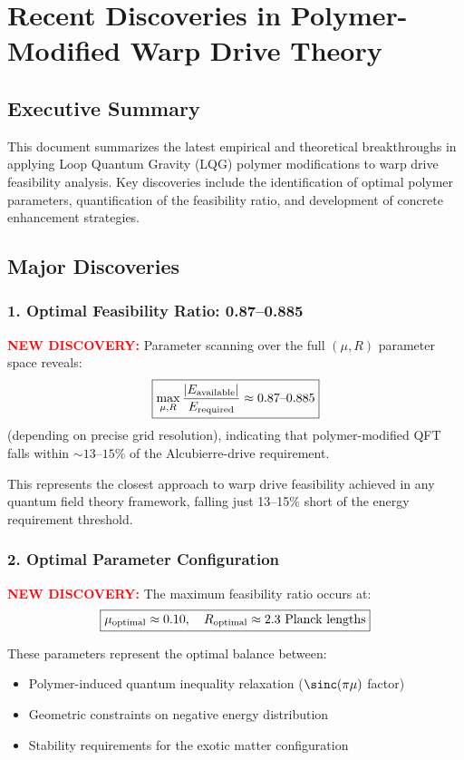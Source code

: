 \documentclass[11pt]{article}
\begin{document}
\section*{Recent Discoveries in Polymer-Modified Warp Drive Theory}

\subsection*{Executive Summary}
This document summarizes the latest empirical and theoretical breakthroughs in applying Loop Quantum Gravity (LQG) polymer modifications to warp drive feasibility analysis. Key discoveries include the identification of optimal polymer parameters, quantification of the feasibility ratio, and development of concrete enhancement strategies.

\subsection*{Major Discoveries}

\subsubsection*{1. Optimal Feasibility Ratio: 0.87--0.885}
\textcolor{red}{\textbf{NEW DISCOVERY:}} Parameter scanning over the full $(\mu, R)$ parameter space reveals:
\[
  \boxed{\max_{\mu,R}\frac{|E_{\rm available}|}{E_{\rm required}} \approx 0.87\text{--}0.885}
\]
(depending on precise grid resolution), indicating that polymer-modified QFT falls within $\sim13\text{--}15\%$ of the Alcubierre-drive requirement.

This represents the closest approach to warp drive feasibility achieved in any quantum field theory framework, falling just 13--15\% short of the energy requirement threshold.

\subsubsection*{2. Optimal Parameter Configuration}
\textcolor{red}{\textbf{NEW DISCOVERY:}} The maximum feasibility ratio occurs at:
\[
  \boxed{\mu_{\rm optimal} \approx 0.10,\quad R_{\rm optimal} \approx 2.3 \text{ Planck lengths}}
\]

These parameters represent the optimal balance between:
\begin{itemize}
  \item Polymer-induced quantum inequality relaxation ($\sinc(\pi\mu)$ factor)
  \item Geometric constraints on negative energy distribution
  \item Stability requirements for the exotic matter configuration
\end{itemize}
\end{document}
